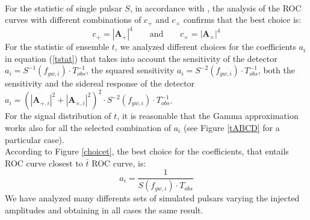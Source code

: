 \documentclass[11pt,a4paper,final]{iopart}
\begin{document}
\\For the statistic of single pulsar $S$, in accordance with \cite{2010}, the analysis of the ROC curves with different combinations of $c_+$ and $c_\times$ confirms that the best choice is:\begin{equation}
c_+=|\textbf{A}_+|^4 \qquad \text{and} \qquad c_\times=|\textbf{A}_\times|^4
\end{equation}  
For the statistic of ensemble $t$, we analyzed different choices for the coefficients $a_i$ in equation (\ref{tstat}) that takes into account the sensitivity of the detector $a_i=S^{-1}(f_{gw,i})\cdot T_{obs}^{-1}$, the squared sensitivity $ a_i=S^{-2}(f_{gw,i})\cdot T_{obs}^{-1}$, both the sensitivity and the sidereal response of the detector  $a_i=(|\textbf{A}_{+,i}|^2+|\textbf{A}_{\times,i}|^2)^2 \cdot S^{-2}(f_{gw,i})\cdot T_{obs}^{-1}$.
\\For the signal distribution of $t$, it is reasonable that the Gamma approximation works also for all the selected combination of $a_i$ (see Figure \ref{tABCD} for a particular case).
\\According to Figure \ref{choicet}, the best choice for the coefficients, that entails ROC curve closest to $\bar{t}$ ROC curve, is:
\begin{equation} \label{statt}
a_i=\frac{1}{S(f_{gw,i})\cdot T_{obs}}
\end{equation}  We have analyzed many differents sets of simulated pulsars varying the injected amplitudes and obtaining in all cases the same result.
\end{document}
